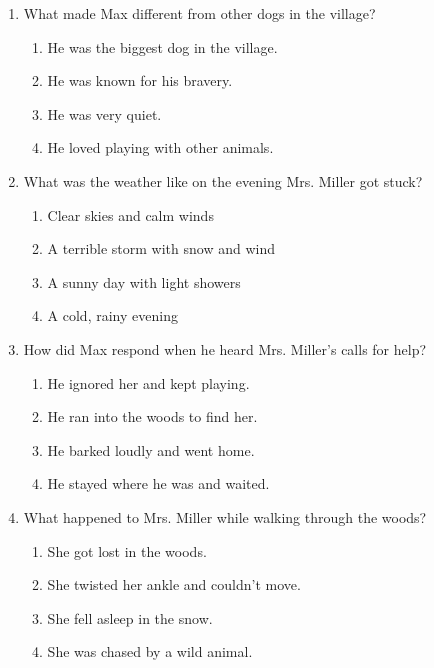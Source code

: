 \documentclass[12pt]{article}
\begin{document}
\begin{enumerate}

    \item What made Max different from other dogs in the village?

    \begin{enumerate}[label=\Alph*.]
        \item He was the biggest dog in the village.
        \item He was known for his bravery.
        \item He was very quiet.
        \item He loved playing with other animals.
    \end{enumerate}
    
    \vspace{0.5cm}

    \item What was the weather like on the evening Mrs. Miller got stuck?

    \begin{enumerate}[label=\Alph*.]
        \item Clear skies and calm winds
        \item A terrible storm with snow and wind
        \item A sunny day with light showers
        \item A cold, rainy evening
    \end{enumerate}
    
    \vspace{0.5cm}

    \item How did Max respond when he heard Mrs. Miller’s calls for help?

    \begin{enumerate}[label=\Alph*.]
        \item He ignored her and kept playing.
        \item He ran into the woods to find her.
        \item He barked loudly and went home.
        \item He stayed where he was and waited.
    \end{enumerate}
    
    \vspace{0.5cm}

    \item What happened to Mrs. Miller while walking through the woods?

    \begin{enumerate}[label=\Alph*.]
        \item She got lost in the woods.
        \item She twisted her ankle and couldn’t move.
        \item She fell asleep in the snow.
        \item She was chased by a wild animal.
    \end{enumerate}
    

\end{enumerate}
\end{document}
